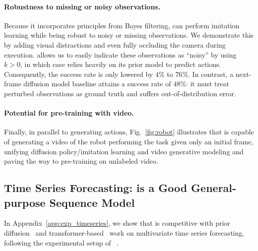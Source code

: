 \paragraph{Robustness to missing or noisy observations.}
Because it incorporates principles from Bayes filtering, 
\algo{} can perform imitation learning while being robust to noisy or missing observations. We demonstrate this by adding visual distractions and even fully occluding the camera during execution.
\algshort{} allows us to easily indicate these observations as ``noisy'' by using $k>0$, in which case \algshort{} relies heavily on its prior model to predict actions. Consequently, the success rate is only lowered by $4\%$ to $76\%$.
In contrast, a next-frame diffusion model baseline attains a success rate of $48\%$: it must treat perturbed observations as ground truth and suffers out-of-distribution error. 

\paragraph{Potential for pre-training with video.} Finally, in parallel to generating actions, Fig.~\ref{fig:robot} illustrates that \algo{} is capable of generating a video of the robot performing the task given only an initial frame, unifying diffusion policy/imitation learning and video generative modeling and paving the way to pre-training on unlabeled video.

\subsection{Time Series Forecasting: \algo{} is a Good General-purpose Sequence Model}
In Appendix~\ref{app:exp_timeseries}, we show that \algshort{} is competitive with prior diffusion~\cite{rasul2021autoregressive} and transformer-based~\cite{rasul2021multivariate} work on multivariate time series forecasting, following the experimental setup of ~\cite{salinas2019highdimensional}. 


